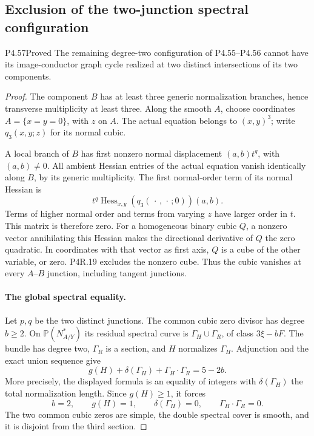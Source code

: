 \subsection{Exclusion of the two-junction spectral configuration}

\begin{statement}{P4.57}{Proved}
The remaining degree-two configuration of P4.55--P4.56
cannot have its image-conductor graph cycle realized at
two distinct intersections of its two components.
\end{statement}
\begin{proof}
The component $B$ has at least three generic normalization
branches, hence transverse multiplicity at least three.
Along the smooth $A$, choose coordinates $A=\{x=y=0\}$,
with $z$ on $A$. The actual equation belongs to $(x,y)^3$;
write $q_3(x,y;z)$ for its normal cubic.

A local branch of $B$ has first nonzero normal displacement
$(a,b)t^q$, with $(a,b)\ne0$. All ambient Hessian entries
of the actual equation vanish identically along $B$, by
its generic multiplicity. The first normal-order term of
its normal Hessian is
\[
       t^q\operatorname{Hess}_{x,y}
                    (q_3(\,\cdot\,,\,\cdot\,;0))(a,b).
\]
Terms of higher normal order and terms from varying $z$
have larger order in $t$. This matrix is therefore zero.
For a homogeneous binary cubic $Q$, a nonzero vector
annihilating this Hessian makes the directional derivative
of $Q$ the zero quadratic. In coordinates with that vector
as first axis, $Q$ is a cube of the other variable, or zero.
P4R.19 excludes the nonzero cube. Thus the cubic vanishes
at every $A$--$B$ junction, including tangent junctions.

\paragraph{The global spectral equality.}
Let $p,q$ be the two distinct junctions. The common cubic
zero divisor has degree $b\ge2$. On $\mathbb P(N_{A/Y}^*)$
its residual spectral curve is $\Gamma_H\cup\Gamma_R$,
of class $3\xi-bF$. The bundle has degree two, $\Gamma_R$
is a section, and $H$ normalizes $\Gamma_H$. Adjunction
and the exact union sequence give
\[
       g(H)+\delta(\Gamma_H)+\Gamma_H\cdot\Gamma_R=5-2b.
\]
More precisely, the displayed formula is an equality of
integers with $\delta(\Gamma_H)$ the total normalization
length. Since $g(H)\ge1$, it forces
\[
 b=2,\qquad g(H)=1,\qquad \delta(\Gamma_H)=0,
                  \qquad\Gamma_H\cdot\Gamma_R=0.          \tag{4.57a}
\]
The two common cubic zeros are simple, the double spectral
cover is smooth, and it is disjoint from the third section.


\end{proof}
